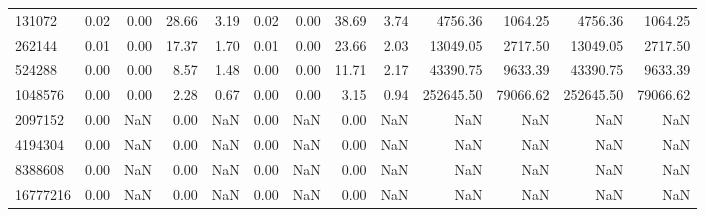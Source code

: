 \begin{tabular}{lrrrrrrrrrrrr}
131072 & 0.02 & 0.00 & 28.66 & 3.19 & 0.02 & 0.00 & 38.69 & 3.74 & 4756.36 & 1064.25 & 4756.36 & 1064.25 \\
262144 & 0.01 & 0.00 & 17.37 & 1.70 & 0.01 & 0.00 & 23.66 & 2.03 & 13049.05 & 2717.50 & 13049.05 & 2717.50 \\
524288 & 0.00 & 0.00 & 8.57 & 1.48 & 0.00 & 0.00 & 11.71 & 2.17 & 43390.75 & 9633.39 & 43390.75 & 9633.39 \\
1048576 & 0.00 & 0.00 & 2.28 & 0.67 & 0.00 & 0.00 & 3.15 & 0.94 & 252645.50 & 79066.62 & 252645.50 & 79066.62 \\
2097152 & 0.00 & NaN & 0.00 & NaN & 0.00 & NaN & 0.00 & NaN & NaN & NaN & NaN & NaN \\
4194304 & 0.00 & NaN & 0.00 & NaN & 0.00 & NaN & 0.00 & NaN & NaN & NaN & NaN & NaN \\
8388608 & 0.00 & NaN & 0.00 & NaN & 0.00 & NaN & 0.00 & NaN & NaN & NaN & NaN & NaN \\
16777216 & 0.00 & NaN & 0.00 & NaN & 0.00 & NaN & 0.00 & NaN & NaN & NaN & NaN & NaN \\
\bottomrule
\end{tabular}
